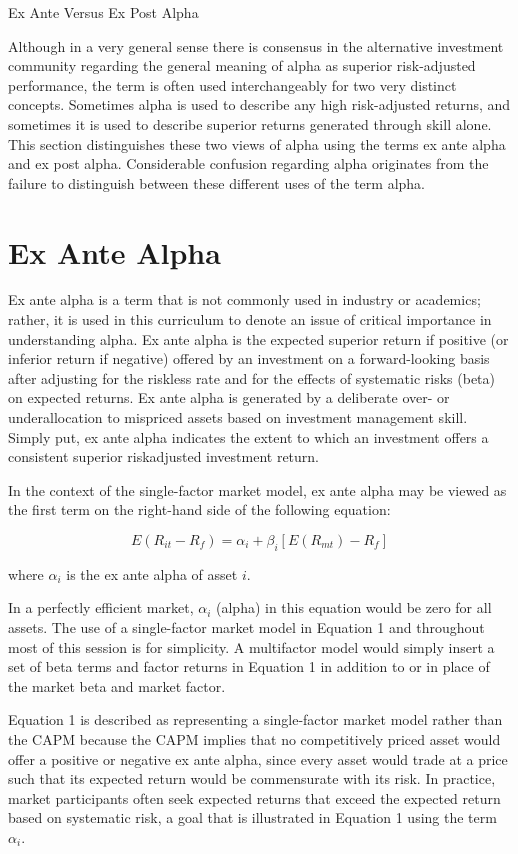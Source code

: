 \documentclass[11pt]{article}
\begin{document}
Ex Ante Versus Ex Post Alpha

Although in a very general sense there is consensus in the alternative investment community regarding the general meaning of alpha as superior risk-adjusted performance, the term is often used interchangeably for two very distinct concepts. Sometimes alpha is used to describe any high risk-adjusted returns, and sometimes it is used to describe superior returns generated through skill alone. This section distinguishes these two views of alpha using the terms ex ante alpha and ex post alpha. Considerable confusion regarding alpha originates from the failure to distinguish between these different uses of the term alpha.

\section*{Ex Ante Alpha}
Ex ante alpha is a term that is not commonly used in industry or academics; rather, it is used in this curriculum to denote an issue of critical importance in understanding alpha. Ex ante alpha is the expected superior return if positive (or inferior return if negative) offered by an investment on a forward-looking basis after adjusting for the riskless rate and for the effects of systematic risks (beta) on expected returns. Ex ante alpha is generated by a deliberate over- or underallocation to mispriced assets based on investment management skill. Simply put, ex ante alpha indicates the extent to which an investment offers a consistent superior riskadjusted investment return.

In the context of the single-factor market model, ex ante alpha may be viewed as the first term on the right-hand side of the following equation:


\begin{equation*}
E\left(R_{i t}-R_{f}\right)=\alpha_{i}+\beta_{i}\left[E\left(R_{m t}\right)-R_{f}\right] \tag{1}
\end{equation*}


where $\alpha_{i}$ is the ex ante alpha of asset $i$.

In a perfectly efficient market, $\alpha_{i}$ (alpha) in this equation would be zero for all assets. The use of a single-factor market model in Equation 1 and throughout most of this session is for simplicity. A multifactor model would simply insert a set of beta terms and factor returns in Equation 1 in addition to or in place of the market beta and market factor.

Equation 1 is described as representing a single-factor market model rather than the CAPM because the CAPM implies that no competitively priced asset would offer a positive or negative ex ante alpha, since every asset would trade at a price such that its expected return would be commensurate with its risk. In practice, market participants often seek expected returns that exceed the expected return based on systematic risk, a goal that is illustrated in Equation 1 using the term $\alpha_{i}$.
\end{document}
